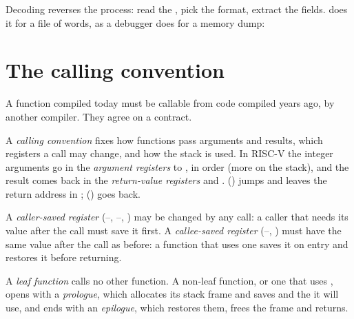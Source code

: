 Decoding reverses the process: read the , pick the format, extract the fields.  does it for a file of
words, as a debugger does for a memory dump:

\label{out:b2:assembly-and-calling-convention:decode}

\section{The calling convention}\label{sec:b2:assembly-and-calling-convention:convention}

A function compiled today must be callable from code compiled years ago, by another compiler. They agree on a
contract.

\begin{definition}\label{def:b2:assembly-and-calling-convention:convention}
A \emph{calling convention} fixes how functions pass arguments and results, which
registers a call may change, and how the stack is used. In RISC-V the integer arguments go in the \emph{argument
registers}  to , in order (more on the stack), and the result comes back in
the \emph{return-value registers}  and . 
() jumps and leaves the return address in ;  () goes back.
\end{definition}

\begin{definition}\label{def:b2:assembly-and-calling-convention:saved}
A \emph{caller-saved register} (--, --,
) may be changed by any call: a caller that needs its value after the call must save it first. A
\emph{callee-saved register} (--, ) must have the same
value after the call as before: a function that uses one saves it on entry and restores it before returning.
\end{definition}

\begin{definition}\label{def:b2:assembly-and-calling-convention:prologue}
A \emph{leaf function} calls no other function. A non-leaf function, or one that uses
, opens with a \emph{prologue}, which allocates its stack frame and saves
 and the  it will use, and ends with an \emph{epilogue}, which
restores them, frees the frame and returns.
\end{definition}

